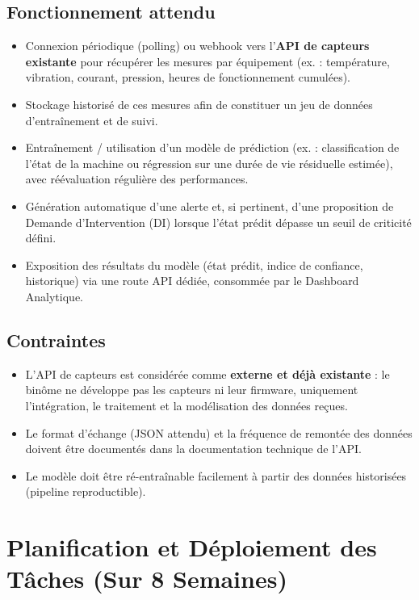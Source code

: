 \documentclass[11pt,a4paper]{article}
\begin{document}
\subsection{Fonctionnement attendu}
\begin{itemize}
  \item Connexion périodique (polling) ou webhook vers l'\textbf{API de capteurs existante} pour récupérer les mesures par équipement (ex. : température, vibration, courant, pression, heures de fonctionnement cumulées).
  \item Stockage historisé de ces mesures afin de constituer un jeu de données d'entraînement et de suivi.
  \item Entraînement / utilisation d'un modèle de prédiction (ex. : classification de l'état de la machine ou régression sur une durée de vie résiduelle estimée), avec réévaluation régulière des performances.
  \item Génération automatique d'une alerte et, si pertinent, d'une proposition de Demande d'Intervention (DI) lorsque l'état prédit dépasse un seuil de criticité défini.
  \item Exposition des résultats du modèle (état prédit, indice de confiance, historique) via une route API dédiée, consommée par le Dashboard Analytique.
\end{itemize}

\subsection{Contraintes}
\begin{itemize}
  \item L'API de capteurs est considérée comme \textbf{externe et déjà existante} : le binôme ne développe pas les capteurs ni leur firmware, uniquement l'intégration, le traitement et la modélisation des données reçues.
  \item Le format d'échange (JSON attendu) et la fréquence de remontée des données doivent être documentés dans la documentation technique de l'API.
  \item Le modèle doit être ré-entraînable facilement à partir des données historisées (pipeline reproductible).
\end{itemize}

\section{Planification et Déploiement des Tâches (Sur 8 Semaines)}
\end{document}
